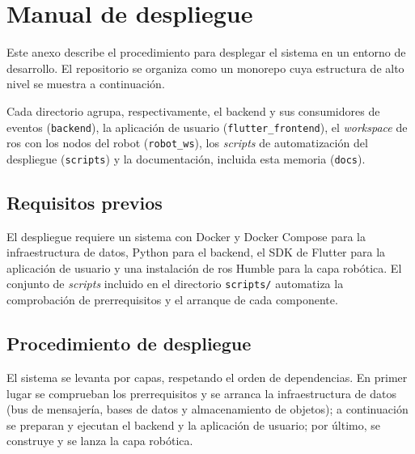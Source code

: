 \chapter{Manual de despliegue}
\label{apx:despliegue}

Este anexo describe el procedimiento para desplegar el sistema en un entorno de
desarrollo. El repositorio se organiza como un monorepo cuya estructura de alto
nivel se muestra a continuación.

\begin{dirtreebox}
\end{dirtreebox}

Cada directorio agrupa, respectivamente, el backend y sus consumidores de
eventos (\texttt{backend}), la aplicación de usuario (\texttt{flutter\_frontend}),
el \textit{workspace} de \gls{ros} con los nodos del robot (\texttt{robot\_ws}),
los \textit{scripts} de automatización del despliegue (\texttt{scripts}) y la
documentación, incluida esta memoria (\texttt{docs}).

\section{Requisitos previos}
\label{sec:requisitos-despliegue}

El despliegue requiere un sistema con Docker y Docker Compose para la
infraestructura de datos, Python para el backend, el SDK de Flutter para la
aplicación de usuario y una instalación de \gls{ros} Humble para la capa
robótica. El conjunto de \textit{scripts} incluido en el directorio
\texttt{scripts/} automatiza la comprobación de prerrequisitos y el arranque de
cada componente.

\section{Procedimiento de despliegue}
\label{sec:procedimiento-despliegue}

El sistema se levanta por capas, respetando el orden de dependencias. En primer
lugar se comprueban los prerrequisitos y se arranca la infraestructura de datos
(bus de mensajería, bases de datos y almacenamiento de objetos); a continuación
se preparan y ejecutan el backend y la aplicación de usuario; por último, se
construye y se lanza la capa robótica.

